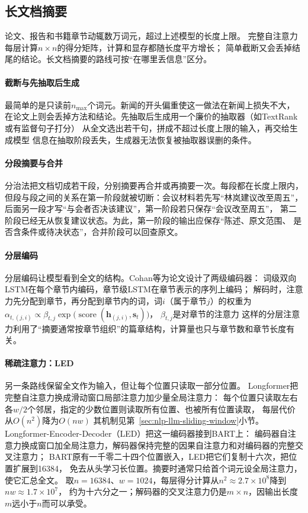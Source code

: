\subsection{长文档摘要}
\label{sec:nlp-generation-long-summary}

论文、报告和书籍章节动辄数万词元，超过上述模型的长度上限。
完整自注意力每层计算$n\times n$的得分矩阵，计算和显存都随长度平方增长；
简单截断又会丢掉结尾的结论。长文档摘要的路线可按“在哪里丢信息”区分。

\paragraph{截断与先抽取后生成}
最简单的是只读前$n_{\max}$个词元。新闻的开头偏重使这一做法在新闻上损失不大，
在论文上则会丢掉方法和结论。先抽取后生成用一个廉价的抽取器（如TextRank或有监督句子打分）
从全文选出若干句，拼成不超过长度上限的输入，再交给生成模型
信息在抽取阶段丢失，生成器无法恢复被抽取器误删的条件。

\paragraph{分段摘要与合并}
分治法把文档切成若干段，分别摘要再合并或再摘要一次。每段都在长度上限内，
但段与段之间的关系在第一阶段就被切断：会议材料若先写“林岚建议改至周五”，
后面另一段才写“与会者否决该建议”，第一阶段若只保存“会议改至周五”，
第二阶段已经无从恢复建议状态。为此，第一阶段的输出应保存“陈述、原文范围、
是否含条件或待决状态”，合并阶段可以回查原文。

\paragraph{分层编码}
分层编码让模型看到全文的结构。Cohan等为论文设计了两级编码器：
词级双向LSTM在每个章节内编码，章节级LSTM在章节表示的序列上编码；
解码时，注意力先分配到章节，再分配到章节内的词，词$i$（属于章节$j$）的权重为
$\alpha_{t,(j,i)}\propto\beta_{t,j}\exp\bigl(\operatorname{score}(\bm h_{(j,i)},\bm s_t)\bigr)$，
$\beta_{t,j}$是对章节的注意力
这样的分层注意力利用了“摘要通常按章节组织”的篇章结构，计算量也只与章节数和章节长度有关。

\paragraph{稀疏注意力：LED}
另一条路线保留全文作为输入，但让每个位置只读取一部分位置。
Longformer把完整自注意力换成滑动窗口局部注意力加少量全局注意力：
每个位置只读取左右各$w/2$个邻居，指定的少数位置则读取所有位置、也被所有位置读取，
每层代价从$O(n^2)$降为$O(nw)$
其机制见第~\ref{sec:nlp-llm-sliding-window}小节。
Longformer-Encoder-Decoder（LED）把这一编码器接到BART上：
编码器自注意力换成窗口加全局注意力，解码器保持完整的因果自注意力和对编码器的完整交叉注意力；
BART原有一千零二十四个位置嵌入，LED把它们复制十六次，把位置扩展到16384，
免去从头学习长位置。摘要时通常只给首个词元设全局注意力，使它汇总全文。
取$n=16384$、$w=1024$，每层得分计算从$n^2\approx2.7\times10^8$降到$nw\approx1.7\times10^7$，
约为十六分之一；解码器的交叉注意力仍是$m\times n$，因输出长度$m$远小于$n$而可以承受。

